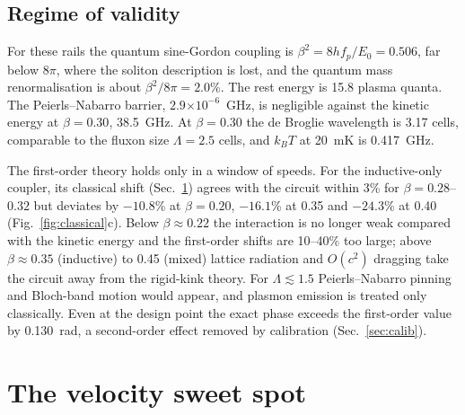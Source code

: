 \documentclass[10pt,twocolumn,letterpaper]{article}
\newcommand{\ee}[1]{\ensuremath{\times10^{#1}}}
\begin{document}
\subsection{Regime of validity}
For these rails the quantum sine-Gordon coupling is $\beta^2=8hf_p/E_0=0.506$, far below $8\pi$, where the soliton
description is lost, and the quantum mass renormalisation is about $\beta^2/8\pi=2.0$\%. The rest energy is 15.8
plasma quanta. The Peierls--Nabarro barrier, $2.9\ee{-6}$~GHz, is negligible against the kinetic energy at
$\beta=0.30$, 38.5~GHz. At $\beta=0.30$ the de Broglie wavelength is 3.17 cells, comparable to the fluxon size
$\Lambda=2.5$ cells, and $k_BT$ at 20~mK is 0.417~GHz.

The first-order theory holds only in a window of speeds. For the inductive-only coupler, its classical shift
(Sec.~\ref{sec:sweet}) agrees with the circuit within 3\% for $\beta=0.28$--$0.32$ but deviates by $-10.8$\% at
$\beta=0.20$, $-16.1$\% at 0.35 and $-24.3$\% at 0.40 (Fig.~\ref{fig:classical}c). Below $\beta\approx0.22$ the
interaction is no longer weak compared with the kinetic energy and the first-order shifts are 10--40\% too large; above
$\beta\approx0.35$ (inductive) to 0.45 (mixed) lattice radiation and $O(c^2)$ dragging take the circuit away from the
rigid-kink theory. For $\Lambda\lesssim1.5$ Peierls--Nabarro pinning and Bloch-band motion would appear, and plasmon
emission is treated only classically. Even at the design point the exact phase exceeds the first-order value by
0.130~rad, a second-order effect removed by calibration (Sec.~\ref{sec:calib}).

\section{The velocity sweet spot}
\label{sec:sweet}
\end{document}

